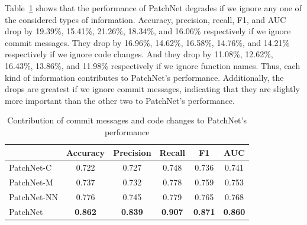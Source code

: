 Table~\ref{tab:components} shows that the performance of PatchNet degrades
if we ignore any one of the considered types of information. Accuracy,
precision, recall, F1, and AUC drop by 19.39\%, 15.41\%, 21.26\%, 18.34\%,
and 16.06\% respectively if we ignore commit messages. They drop by 16.96\%,
14.62\%, 16.58\%, 14.76\%, and 14.21\% respectively if we ignore code
changes.  And they drop by 11.08\%, 12.62\%, 16.43\%, 13.86\%, and 11.98\%
respectively if we ignore function names.  Thus, each kind of information
contributes to PatchNet's performance.  Additionally, the drops are
greatest if we ignore commit messages, indicating that they are slightly
more important than the other two to PatchNet's performance.

\begin{table}[t!]
  \centering
  \caption{Contribution of commit messages and code changes to PatchNet's performance}
    \begin{tabular}{|l|c|c|c|c|c|}
    \hline
          & \textbf{Accuracy} & \textbf{Precision} & \textbf{Recall} & \textbf{F1}    & \textbf{AUC} \\
    \hline
    \hline
    PatchNet-C & 0.722 & 0.727 & 0.748 & 0.736 & 0.741 \\
    \hline
    PatchNet-M & 0.737 & 0.732 & 0.778 & 0.759 & 0.753 \\
    \hline
    PatchNet-NN & 0.776 & 0.745 & 0.779 & 0.765 & 0.768 \\
    \hline
    PatchNet & \textbf{0.862} & \textbf{0.839} & \textbf{0.907} & \textbf{0.871} & \textbf{0.860} \\
    \hline
    \end{tabular}%
  \label{tab:components}%
\end{table}%


